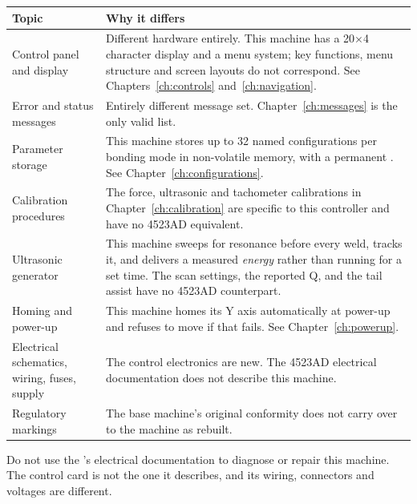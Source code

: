 \begin{center}\small
\begin{tabular}{@{}L{40mm}L{82mm}@{}}
\toprule
\textbf{Topic} & \textbf{Why it differs} \\
\midrule

Control panel and display &
Different hardware entirely. This machine has a 20$\times$4 character display
and a menu system; key functions, menu structure and screen layouts do not
correspond. See Chapters~\ref{ch:controls} and~\ref{ch:navigation}. \\
\addlinespace

Error and status messages &
Entirely different message set. Chapter~\ref{ch:messages} is the only valid
list. \\
\addlinespace

Parameter storage &
This machine stores up to 32 named configurations per bonding mode in
non-volatile memory, with a permanent . See
Chapter~\ref{ch:configurations}. \\
\addlinespace

Calibration procedures &
The force, ultrasonic and tachometer calibrations in
Chapter~\ref{ch:calibration} are specific to this controller and have no
4523AD equivalent. \\
\addlinespace

Ultrasonic generator &
This machine sweeps for resonance before every weld, tracks it, and delivers a
measured \emph{energy} rather than running for a set time. The scan settings,
the reported Q, and the tail assist have no 4523AD counterpart. \\
\addlinespace

Homing and power-up &
This machine homes its Y axis automatically at power-up and refuses to move if
that fails. See Chapter~\ref{ch:powerup}. \\
\addlinespace

Electrical schematics, wiring, fuses, supply &
The control electronics are new. The 4523AD electrical documentation does not
describe this machine. \\
\addlinespace

Regulatory markings &
The base machine's original conformity does not carry over to the machine as
rebuilt. \\

\bottomrule
\end{tabular}
\end{center}

\begin{wbwarning}
Do not use the \ksmanual's electrical documentation to diagnose or repair this
machine. The control card is not the one it describes, and its wiring,
connectors and voltages are different.
\end{wbwarning}

